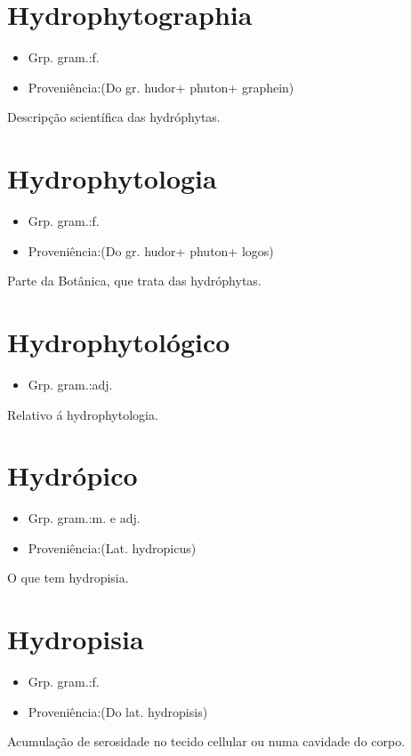 \documentclass{article}
\begin{document}
\section{Hydrophytographia}
\begin{itemize}
\item {Grp. gram.:f.}
\end{itemize}
\begin{itemize}
\item {Proveniência:(Do gr. \textunderscore hudor\textunderscore  + \textunderscore phuton\textunderscore  + \textunderscore graphein\textunderscore )}
\end{itemize}
Descripção scientífica das hydróphytas.
\section{Hydrophytologia}
\begin{itemize}
\item {Grp. gram.:f.}
\end{itemize}
\begin{itemize}
\item {Proveniência:(Do gr. \textunderscore hudor\textunderscore  + \textunderscore phuton\textunderscore  + \textunderscore logos\textunderscore )}
\end{itemize}
Parte da Botânica, que trata das hydróphytas.
\section{Hydrophytológico}
\begin{itemize}
\item {Grp. gram.:adj.}
\end{itemize}
Relativo á hydrophytologia.
\section{Hydrópico}
\begin{itemize}
\item {Grp. gram.:m.  e  adj.}
\end{itemize}
\begin{itemize}
\item {Proveniência:(Lat. \textunderscore hydropicus\textunderscore )}
\end{itemize}
O que tem hydropisia.
\section{Hydropisia}
\begin{itemize}
\item {Grp. gram.:f.}
\end{itemize}
\begin{itemize}
\item {Proveniência:(Do lat. \textunderscore hydropisis\textunderscore )}
\end{itemize}
Acumulação de serosidade no tecido cellular ou numa cavidade do corpo.
\end{document}
